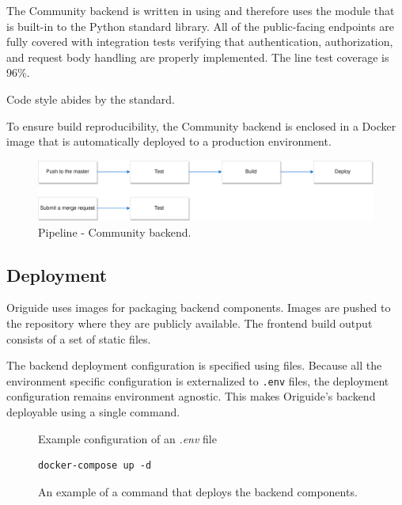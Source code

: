 The Community backend is written in  using  and therefore uses the  module that is built-in to the Python standard library. All of the public-facing endpoints are fully covered with integration tests verifying that authentication, authorization, and request body handling are properly implemented. The line test coverage is 96\%.

\medskip
Code style abides by the  standard.

\medskip
To ensure build reproducibility, the Community backend is enclosed in a Docker image that is automatically deployed to a production environment. 

\begin{figure}[H]
  \caption{Pipeline - Community backend.}
  \centering
    \includegraphics[width=\textwidth]{assets/3-community-pipeline.png}
\end{figure}

\subsection{Deployment}

Origuide uses  images for packaging backend components. Images are pushed to the  repository where they are publicly available. The frontend build output consists of a set of static files.

\medskip
The backend deployment configuration is specified using  files. 
Because all the environment specific configuration is externalized to \texttt{.env} files, the deployment configuration remains environment agnostic. This makes Origuide's backend deployable using a single command.

\begin{figure}[H]
	\caption{Example configuration of an \textit{.env} file}
	
\end{figure}

\begin{figure}[H]
	\caption{An example of a command that deploys the backend components.}
	\begin{lstlisting}
docker-compose up -d
	\end{lstlisting}
\end{figure}

